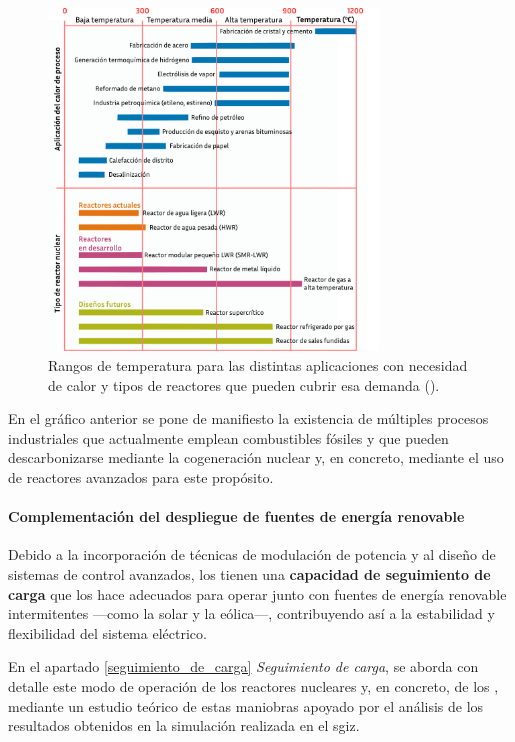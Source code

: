 \begin{figure}[h]
  \centering
  \includegraphics[width=0.78\textwidth]{content/figures/aplicaciones_calor.pdf}
  \caption{Rangos de temperatura para las distintas aplicaciones con necesidad de calor y tipos de reactores que pueden cubrir esa demanda (\cite{wna_heat_applications}).}
  \label{fig:wna_heat_applications}
\end{figure}

En el gráfico anterior se pone de manifiesto la existencia de múltiples procesos industriales que actualmente emplean combustibles fósiles y que pueden descarbonizarse mediante la cogeneración nuclear y, en concreto, mediante el uso de reactores avanzados para este propósito.

\paragraph{Complementación del despliegue de fuentes de energía renovable}

Debido a la incorporación de técnicas de modulación de potencia y al diseño de sistemas de control avanzados, los  tienen una \textbf{capacidad de seguimiento de carga} que los hace adecuados para operar junto con fuentes de energía renovable intermitentes ---como la solar y la eólica---, contribuyendo así a la estabilidad y flexibilidad del sistema eléctrico.

En el apartado \ref{seguimiento_de_carga} \textit{Seguimiento de carga}, se aborda con detalle este modo de operación de los reactores nucleares y, en concreto, de los , mediante un estudio teórico de estas maniobras apoyado por el análisis de los resultados obtenidos en la simulación realizada en el \acrshort{sgiz}.

